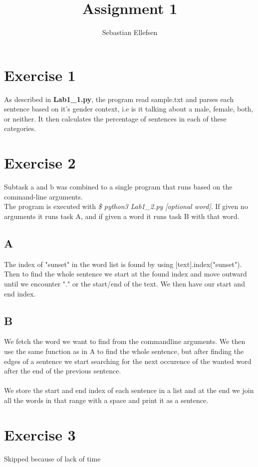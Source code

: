 \documentclass{article}
\author{Sebastian Ellefsen}
\title{Assignment 1}
\begin{document}
	\maketitle
	\section{Exercise 1}
	
	As described in \textbf{Lab1\_1.py}, the program read sample.txt and parses each sentence based on it's gender context, i.e is it talking about a male, female, both, or neither. It then calculates the percentage of sentences in each of these categories.
	
	\section{Exercise 2}
	
	Subtask a and b was combined to a single program that runs based on the command-line arguments.\\
	The program is executed with \textit{\$ python3 Lab1\_2.py [optional word]}. If given no arguments it runs task A, and if given a word it runs task B with that word.
	
	\subsection{A}
	The index of "sunset" in the word list is found by using [text].index("sunset"). Then to find the whole sentence we start at the found index and move outward until we encounter "." or the start/end of the text. We then have our start and end index.
	
	\subsection{B}
	We fetch the word we want to find from the commandline arguments. We then use the same function as in A to find the whole sentence, but after finding the edges of a sentence we start searching for  the next occurence of the wanted word after the end of the previous sentence.
	\\ \\
	We store the start and end index of each sentence in a list and at the end we join all the words in that range with a space and print it as a sentence.
	
	\section{Exercise 3}
	Skipped because of lack of time
	
\end{document}
